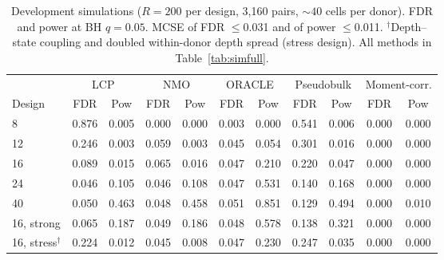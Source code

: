 \begin{table}[t]\centering
\caption{Development simulations ($R=200$ per design, 3{,}160 pairs, ${\sim}40$ cells per donor). FDR and power at BH $q=0.05$. MCSE of FDR $\le$0.031 and of power $\le$0.011. $^\dagger$Depth--state coupling and doubled within-donor depth spread (stress design). All methods in Table~\ref{tab:simfull}.}\label{tab:sim}
\begin{tabular}{lcccccccccc}
\toprule
& \multicolumn{2}{c}{LCP} & \multicolumn{2}{c}{NMO} & \multicolumn{2}{c}{ORACLE} & \multicolumn{2}{c}{Pseudobulk} & \multicolumn{2}{c}{Moment-corr.} \\
Design & FDR & Pow & FDR & Pow & FDR & Pow & FDR & Pow & FDR & Pow \\
\midrule
8 & 0.876 & 0.005 & 0.000 & 0.000 & 0.003 & 0.000 & 0.541 & 0.006 & 0.000 & 0.000 \\
12 & 0.246 & 0.003 & 0.059 & 0.003 & 0.045 & 0.054 & 0.301 & 0.016 & 0.000 & 0.000 \\
16 & 0.089 & 0.015 & 0.065 & 0.016 & 0.047 & 0.210 & 0.220 & 0.047 & 0.000 & 0.000 \\
24 & 0.046 & 0.105 & 0.046 & 0.108 & 0.047 & 0.531 & 0.140 & 0.168 & 0.000 & 0.000 \\
40 & 0.050 & 0.463 & 0.048 & 0.458 & 0.051 & 0.851 & 0.129 & 0.494 & 0.000 & 0.010 \\
16, strong & 0.065 & 0.187 & 0.049 & 0.186 & 0.048 & 0.578 & 0.138 & 0.321 & 0.000 & 0.000 \\
16, stress$^\dagger$ & 0.224 & 0.012 & 0.045 & 0.008 & 0.047 & 0.230 & 0.247 & 0.035 & 0.000 & 0.000 \\
\bottomrule
\end{tabular}
\end{table}
